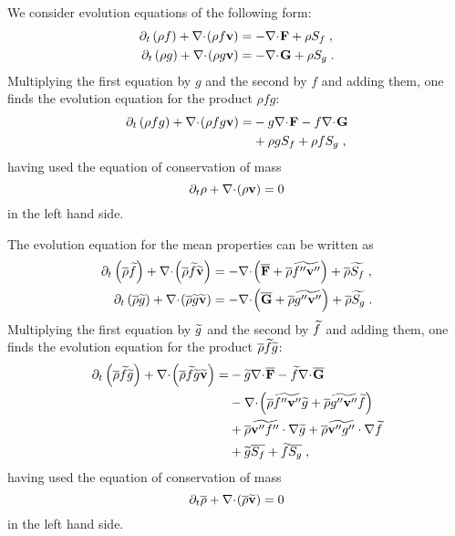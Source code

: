 We consider evolution equations of the following form:
\begin{subequations}
    \begin{align}
        \ptp{\rho f}{t} + \dvp{\rho f\mathbf{v}}& =-\dv{\mathbf{F}} + \rho S_f \;,\\
        \ptp{\rho g}{t} + \dvp{\rho g\mathbf{v}}& =-\dv{\mathbf{G}} + \rho S_g \;.
    \end{align}
\end{subequations}
Multiplying the first equation by $g$ and the second by $f$ and adding them, one finds the evolution equation for the product $\rho f g$:
\begin{equation}\label{equ:fg}
    \begin{split}
        \ptp{\rho fg}{t} + \dvp{\rho fg\mathbf{v}}=&-g\dv{\mathbf{F}}-f\dv{\mathbf{G}}\\
        &+ \rho gS_f + \rho fS_g\;,
    \end{split}
\end{equation}
having used the equation of conservation of mass
\begin{equation}
    \pt{\rho}{t} + \dvp{\rho\mathbf{v}}=0
\end{equation}
in the left hand side.

The evolution equation for the mean properties can be written as
\begin{subequations}
    \begin{align}
        \ptp{\avr{\rho}\avf{f}}{t} + \dvp{\avr{\rho}\avf{f}\avf{\mathbf{v}}} &=
        -\dvp{\avr{\mathbf{F}}+\avr{\rho}\avf{f''\mathbf{v}''}} + \avr{\rho}\avf{S_f} \;,\\
        \ptp{\avr{\rho}\avf{g}}{t} + \dvp{\avr{\rho}\avf{g}\avf{\mathbf{v}}} &=
        -\dvp{\avr{\mathbf{G}}+\avr{\rho}\avf{g''\mathbf{v}''}} + \avr{\rho}\avf{S_g} \;.
    \end{align}
\end{subequations}
Multiplying the first equation by $\avf{g}$ and the second by $\avf{f}$ and adding them, one finds the evolution equation for the product $\avr{\rho}\avf{f}\avf{g}$:
\begin{equation}\label{equ:avfg}
    \begin{split}
        \ptp{\avr{\rho} \avf{f}\avf{g}}{t} + \dvp{\avr{\rho} \avf{f}\avf{g}\avf{\mathbf{v}}}=
        &-\avf{g}\dv{\avr{\mathbf{F}}}-\avf{f}\dv{\avr{\mathbf{G}}}\\
        &-\dvp{\avr{\rho}\avf{f''\mathbf{v}''}\avf{g}+\avr{\rho}\avf{g''\mathbf{v}''}\avf{f}}\\
        &+ \avr{\rho}\avf{\mathbf{v}''f''}\cdot\nabla \avf{g}
        + \avr{\rho}\avf{\mathbf{v}''g''}\cdot\nabla \avf{f}\\
        &+ \avf{g}\avr{S_f} + \avf{f}\avr{S_g}\;,
    \end{split}
\end{equation}
having used the equation of conservation of mass
\begin{equation}
    \pt{\avr{\rho}}{t} + \dvp{\avr{\rho}\avf{\mathbf{v}}}=0
\end{equation}
in the left hand side.

